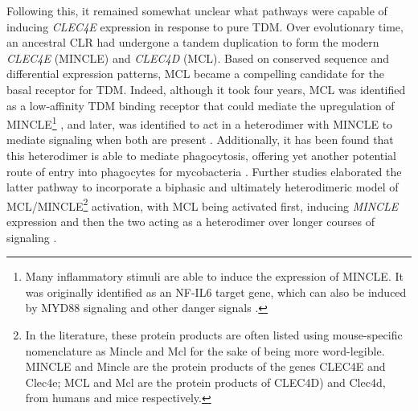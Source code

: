 Following this, it remained somewhat unclear what pathways were capable of inducing \textit{CLEC4E} expression in response to pure TDM. Over evolutionary time, an ancestral CLR had undergone a tandem duplication to form the modern \textit{CLEC4E} (MINCLE) and \textit{CLEC4D} (MCL). Based on conserved sequence and differential expression patterns, MCL became a compelling candidate for the basal receptor for TDM. Indeed, although it took four years, MCL was identified as a low\hyp{}affinity TDM binding receptor that could mediate the upregulation of MINCLE\footnote{Many inflammatory stimuli are able to induce the expression of MINCLE. It was originally identified as an NF-IL6 target gene, which can also be induced by MYD88 signaling and other danger signals \citep{Kerscher2016b}.} \citep{Miyake2013}, and later, was identified to act in a heterodimer with MINCLE to mediate signaling when both are present \citep{LobatoPascual2013, Kerscher2016a, Yamasaki2013, Furukawa2013}. Additionally, it has been found that this heterodimer is able to mediate phagocytosis, offering yet another potential route of entry into phagocytes for mycobacteria \citep{Yamasaki2013, LobatoPascual2013}. Further studies elaborated the latter pathway to incorporate a biphasic and ultimately heterodimeric model of MCL/MINCLE\footnote{In the literature, these protein products are often listed using mouse\hyp{}specific nomenclature as Mincle and Mcl for the sake of being more word\hyp{}legible. MINCLE and Mincle are the protein products of the genes CLEC4E and Clec4e; MCL and Mcl are the protein products of CLEC4D) and Clec4d, from humans and mice respectively.} activation, with MCL being activated first, inducing \textit{MINCLE} expression and then the two acting as a heterodimer over longer courses of signaling \citep{LobatoPascual2013, Yamasaki2013, Furukawa2013}.

